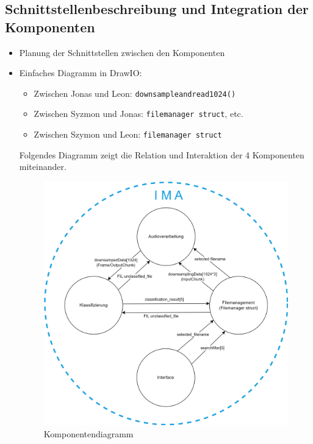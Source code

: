 \newpage

\subsection{Schnittstellenbeschreibung und Integration der Komponenten}
\begin{itemize}
    \item Planung der Schnittstellen zwischen den Komponenten
    \item Einfaches Diagramm in DrawIO:
    \begin{itemize}
        \item Zwischen Jonas und Leon: \texttt{downsampleandread1024()}
        \item Zwischen Syzmon und Jonas: \texttt{filemanager struct}, etc.
        \item Zwischen Szymon und Leon: \texttt{filemanager struct}
    \end{itemize}
    
    
    Folgendes Diagramm zeigt die Relation und Interaktion der 4 Komponenten miteinander.
    
    \begin{figure}[H]
    	\centering
    	\includegraphics[width=1.0\textwidth]{images/04_spezifikation/komponentendiagramm.drawio.png}
    	\caption{Komponentendiagramm}
    	\label{fig:komponentendiagramm}
    \end{figure}
    
\end{itemize}